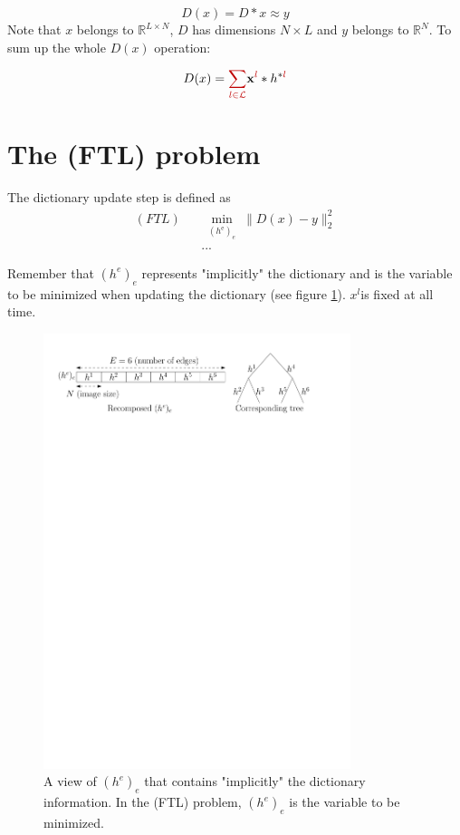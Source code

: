 $$D(x) = D*x \approx y$$
Note that $x$ belongs to $\mathbb{R}^{L\times N}$, $D$ has dimensions $N \times L$ and $y$ belongs to $\mathbb{R}^N$. To sum up the whole $D(x)$ operation:

$$
D(x) = \Req{\sum_{l \in \leaves}} \code^{\Req{l}} * h^{*\Req{l}}
$$


\section{The (FTL) problem}

The dictionary update step is defined as 
\begin{equation*} \begin{aligned}
(FTL) && \underset{\substack{(h^\text{e})_{e}}}\min \lVert D(x) - y \rVert_2^2 \\
&& ...
\end{aligned} \end{equation*}

Remember that $(h^e)_e$ represents "implicitly" the dictionary and is the variable to be minimized when updating the dictionary (see figure \ref{fig_hk_tree}). $x^l$is fixed at all time.

\begin{figure}[!ht] \centering
\includegraphics[width=0.8\textwidth]{figures/hk_tree.pdf}
\caption{A view of $(h^e)_e$ that contains "implicitly" the dictionary information. In the (FTL) problem, $(h^e)_e$ is the variable to be minimized.}\label{fig_hk_tree}
\end{figure}

